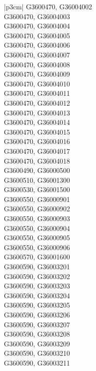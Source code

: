 \begin{customLongTable}{ |p{3cm}| }
G3600470, G36004002 \\ \hline
G3600470, G36004003 \\ \hline
G3600470, G36004004 \\ \hline
G3600470, G36004005 \\ \hline
G3600470, G36004006 \\ \hline
G3600470, G36004007 \\ \hline
G3600470, G36004008 \\ \hline
G3600470, G36004009 \\ \hline
G3600470, G36004010 \\ \hline
G3600470, G36004011 \\ \hline
G3600470, G36004012 \\ \hline
G3600470, G36004013 \\ \hline
G3600470, G36004014 \\ \hline
G3600470, G36004015 \\ \hline
G3600470, G36004016 \\ \hline
G3600470, G36004017 \\ \hline
G3600470, G36004018 \\ \hline
G3600490, G36000500 \\ \hline
G3600510, G36001300 \\ \hline
G3600530, G36001500 \\ \hline
G3600550, G36000901 \\ \hline
G3600550, G36000902 \\ \hline
G3600550, G36000903 \\ \hline
G3600550, G36000904 \\ \hline
G3600550, G36000905 \\ \hline
G3600550, G36000906 \\ \hline
G3600570, G36001600 \\ \hline
G3600590, G36003201 \\ \hline
G3600590, G36003202 \\ \hline
G3600590, G36003203 \\ \hline
G3600590, G36003204 \\ \hline
G3600590, G36003205 \\ \hline
G3600590, G36003206 \\ \hline
G3600590, G36003207 \\ \hline
G3600590, G36003208 \\ \hline
G3600590, G36003209 \\ \hline
G3600590, G36003210 \\ \hline
G3600590, G36003211 \\ \hline

\end{customLongTable}
